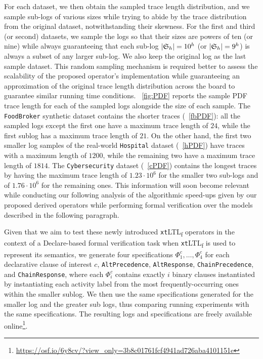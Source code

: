 \documentclass[sigconf]{acmart}
\begin{document}
For each dataset, we then obtain the sampled trace length distribution, and we sample sub-logs of various sizes while trying to abide by the trace distribution from the original dataset, notwithstanding their skewness. For the first and third (or second) datasets, we sample the logs so that their sizes are powers of ten (or nine) while always guaranteeing that each sub-log $|\mathfrak{S}_h|=10^h$ (or $|\mathfrak{S}_h|=9^h$) is always a subset of any larger sub-log. We also keep the original log as the last sample dataset. This random sampling mechanism is required better to assess the scalability of the proposed operator's implementation while guaranteeing an approximation of the original trace length distribution across the board to guarantee similar running time conditions. \figurename~\ref{fig:PDF} reports the sample PDF trace length for each of the sampled logs alongside the size of each sample. The \texttt{FoodBroker} synthetic dataset contains the shorter traces (\figurename~\ref{fbPDF}): all the sampled logs except the first one have a maximum trace length of $24$, while the first sublog has a maximum trace length of $21$. On the other hand, the first two smaller log samples of the real-world \texttt{Hospital} dataset (\figurename~\ref{hPDF}) have traces with a maximum length of $1200$, while the remaining two have a maximum trace length of $1814$. The \texttt{Cybersecurity} dataset (\figurename ~\ref{cPDF}) contains the longest traces by having the maximum trace length of $1.23\cdot10^6$ for the smaller two sub-logs and of $1.76\cdot 10^6$ for the remaining ones. This information will soon become relevant while conducting our following analysis of the algorithmic speed-ups given by our proposed derived operators while performing formal verification over the models described in the following paragraph.


 Given that we aim to test these newly introduced \texttt{xt}LTL\textsubscript{f} operators in the context of a Declare-based formal verification task when \texttt{xt}LTL\textsubscript{f} is used to represent its semantics, we generate four specifications $\Phi^c_1,\dots,\Phi^c_4$ for each declarative clause of interest $c$, \texttt{AltPrecedence}, \texttt{AltResponse}, \texttt{ChainPrecedence}, and \texttt{ChainResponse}, where each $\Phi^c_i$ contains exactly $i$ binary clauses instantiated by instantiating each activity label from the most frequently-occurring ones within the smaller sublog. We then use the same specifications generated for the smaller log and the greater sub logs, thus comparing running experiments with the same specifications. The resulting logs and specifications are freely available online\footnote{\url{https://osf.io/6y8cv/?view_only=3b8c01761fcf4941ad726aba4101151e}}. \medskip
\end{document}
